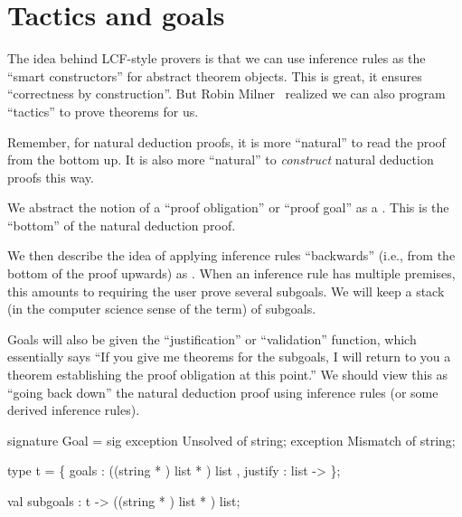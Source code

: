 \section{Tactics and goals}

\begin{node}
The idea behind LCF-style provers is that we can use
inference rules as the ``smart constructors'' for abstract theorem
objects. This is great, it ensures ``correctness by construction''.
But Robin Milner~\cite{milner1984use} realized we can also program ``tactics'' to prove theorems for us.

Remember, for natural deduction proofs, it is more ``natural'' to read
the proof from the bottom up. It is also more ``natural'' to
\emph{construct} natural deduction proofs this way.

We abstract the notion of a ``proof obligation'' or ``proof goal'' as
a . This is the ``bottom'' of the natural deduction
proof. 

We then describe the idea of applying inference rules ``backwards''
(i.e., from the bottom of the proof upwards) as . When
an inference rule has multiple premises, this amounts to requiring the
user prove several subgoals. We will keep a stack (in the computer
science sense of the term) of subgoals.

Goals will also be given the ``justification'' or ``validation'' function, which
essentially says ``If you give me theorems for the subgoals, I will
return to you a theorem establishing the proof obligation at this point.''
We should view this as ``going back down'' the natural deduction proof
using inference rules (or some derived inference rules).
\end{node}

\nwenddocs{}\endmoddef\nwstartdeflinemarkup\nwenddeflinemarkup
signature Goal = sig
  exception Unsolved of string;
  exception Mismatch of string;
  
  type t = \{ goals : ((string * ) list * ) list
           , justify :  list ->  \};

  val subgoals : t -> ((string * ) list * ) list;

